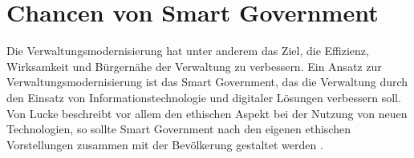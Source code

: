 \section{Chancen von Smart Government}
Die Verwaltungsmodernisierung hat unter anderem das Ziel, die Effizienz, Wirksamkeit und Bürgernähe der Verwaltung zu verbessern.
Ein Ansatz zur Verwaltungsmodernisierung ist das Smart Government, das die Verwaltung durch den Einsatz von Informationstechnologie und digitaler Lösungen verbessern soll.
Von Lucke beschreibt vor allem den ethischen Aspekt bei der Nutzung von neuen Technologien, so sollte Smart Government nach den eigenen ethischen Vorstellungen zusammen mit der Bevölkerung gestaltet werden \citep[Vgl.][S. 108]{Lucke2018}.


\newpage
 
